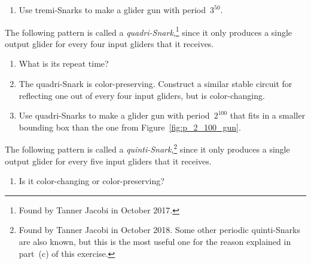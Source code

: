 \begin{multicols}{2}
\begin{problem}
\begin{enumerate}[label=\bf\color{ocre}(\alph*)]
			\item Use tremi-Snarks to make a glider gun with period~$3^{50}$.
		\end{enumerate}
	\end{problem}
	
	
	\mfilbreak
	
	
	\begin{problem}\label{exer:quadri_snark}
		The following pattern is called a \emph{quadri-Snark},\footnote{Found by Tanner Jacobi in October 2017.} since it only produces a single output glider for every four input gliders that it receives.
		
		\begin{center}
		\end{center}
		
		\begin{enumerate}[label=\bf\color{ocre}(\alph*)]
			\item What is its repeat time?%
			
			\item The quadri-Snark is color-preserving. Construct a similar stable circuit for reflecting one out of every four input gliders, but is color-changing.%
			
			\item Use quadri-Snarks to make a glider gun with period~$2^{100}$ that fits in a smaller bounding box than the one from Figure~\ref{fig:p_2_100_gun}.
		\end{enumerate}
	\end{problem}
	
	
	\mfilbreak
	
	
	\begin{problem}\label{exer:quinti_snark}
		The following pattern is called a \emph{quinti-Snark},\footnote{Found by Tanner Jacobi in October 2018. Some other periodic quinti-Snarks are also known, but this is the most useful one for the reason explained in part~(c) of this exercise.} since it only produces a single output glider for every five input gliders that it receives.
		
		\begin{center}
		\end{center}
		
		\begin{enumerate}[label=\bf\color{ocre}(\alph*)]
			\item Is it color-changing or color-preserving?%
			

\end{enumerate}
\end{problem}
\end{multicols}
